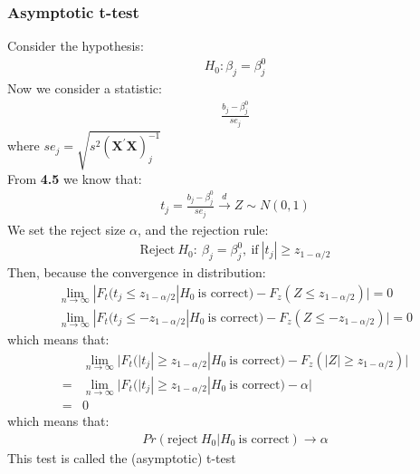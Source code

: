 \documentclass{article}
\begin{document}
\subsubsection{Asymptotic t-test}
Consider the hypothesis:
	\begin{align*}
		H_0 : \beta_j = \beta^0_j
	\end{align*}
Now we consider a statistic:
	\begin{align*}
		\frac{b_j - \beta^0_j}{se_j}
	\end{align*}
where $se_j = \sqrt{s^2 (\boldsymbol{X}^\prime \boldsymbol{X})^{-1}_j}$\\
From \textbf{4.5} we know that:
	\begin{align*}
		t_j = \frac{b_j - \beta^0_j}{se_j} \xrightarrow{d} Z \sim N(0, 1)
	\end{align*}
We set the reject size $\alpha$, and the rejection rule:
	\begin{align*}
		\text{Reject}\ H_0:\ \beta_j = \beta^0_j,\ \text{if}\ |t_j| \geq z_{1 - \alpha / 2}
	\end{align*}
Then, because the convergence in distribution:
	\begin{align*}
		\lim\limits_{n\to\infty} |F_t(t_j \leq z_{1 - \alpha / 2} | H_0\ \text{is correct}) - F_z(Z \leq z_{1 - \alpha / 2})| = 0\\
		\lim\limits_{n\to\infty} |F_t(t_j \leq -z_{1 - \alpha / 2} | H_0\ \text{is correct}) - F_z(Z \leq -z_{1 - \alpha / 2})| = 0
	\end{align*}
which means that:
	\begin{align*}
		&\lim\limits_{n\to\infty} |F_t(|t_j| \geq z_{1 - \alpha / 2} | H_0\ \text{is correct}) - F_z(|Z| \geq z_{1 - \alpha / 2})|\\ = &
		\lim\limits_{n\to\infty} |F_t(|t_j| \geq z_{1 - \alpha / 2} | H_0\ \text{is correct}) - \alpha|\\ = &
		0
	\end{align*}
which means that:
	\begin{align*}
		Pr(\text{reject}\ H_0 | H_0\ \text{is correct}) \to \alpha
	\end{align*}	
This test is called the (asymptotic) t-test
\end{document}

